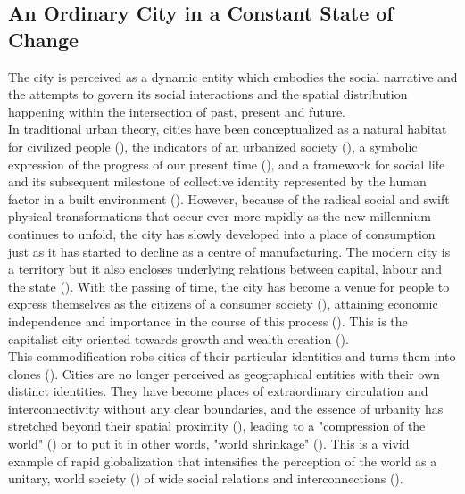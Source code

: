 \documentclass[11pt]{report}
\begin{document}
{{{\subsection{An Ordinary City in a Constant State of Change}

The city is perceived as a dynamic entity which embodies the social narrative and the attempts to govern its social interactions and the spatial distribution happening within the intersection of past, present and future.
\\

In traditional urban theory, cities have been conceptualized as a natural habitat for civilized people (\href{Park}{\citealt{park_human_1952}}), the indicators 
of an urbanized society (\href{Mumford}{\citealt{mumford_city_1961}}), a symbolic expression of the progress of our present time (\href{Osborne}{\citealt{osborne_modernity_1992}}), and a 
framework for social life and its subsequent milestone of collective identity represented by the human factor in a built environment (\href{Berman}{\citealt{berman_all_1988}}).
However, because of the radical social and swift physical transformations that occur ever more rapidly as the new millennium continues to unfold, the city has slowly developed into a place of consumption just as it has started to decline as a centre of manufacturing. The modern city is a territory but it also encloses underlying relations between capital, labour and the state (\href{Castells}{\citealt{castells_city_1983}}).
With the passing of time, the city has become a venue for people to express themselves as the citizens of a consumer society (\href{Slater}{\citealt{slater_consumer_2003}}), attaining economic independence and importance in the course of this process (\href{Miles}{\citealt{miles_spaces_2010}}).
This is the capitalist city oriented towards growth and wealth creation (\href{Harvey}{\citealt{harvey_urban_1978}}).
\\   

This commodification robs cities of their particular identities and turns them into clones (\href{Miles}{\citealt{miles_spaces_2010}}).
Cities are no longer perceived as geographical entities with their own distinct identities.
They have become places of extraordinary circulation and 
interconnectivity without any clear boundaries, and the essence of urbanity has stretched beyond their spatial proximity (\href{Amin}{\citealt{amin_globalization_1996}}),  leading  to  a  "compression  of  the  world"  (\href{Robertson}{\citealt{robertson_globalization:_1992}}) or  to  put  it  in  other  words,  "world  shrinkage"
(\href{Larsson}{\citealt{larsson_race_2001}}).
This is a vivid example of rapid globalization that intensifies the perception of the world as a unitary, world society (\href{Albrow}{\citealt{albrow_globalization_1990}}) of wide social relations and interconnections (\href{Giddens}{\citealt{giddens_consequences_1992}}). 
\\

}}}
\end{document}
